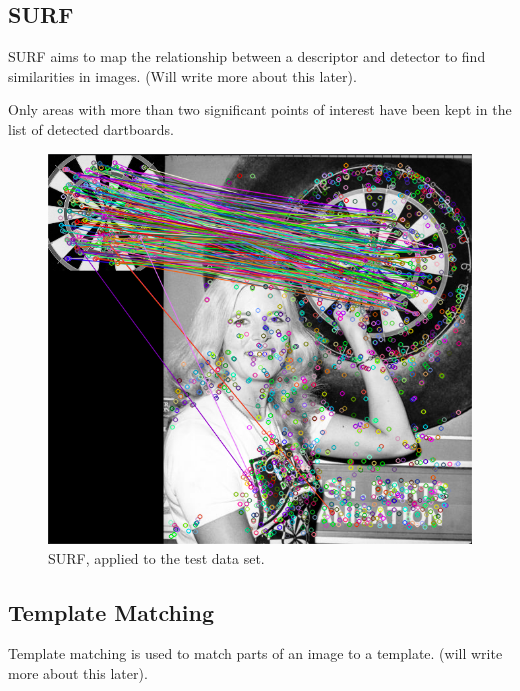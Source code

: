 \documentclass[conference]{IEEEtran}
\begin{document}
\subsection{SURF}
SURF aims to map the relationship between a descriptor and detector to find similarities in images. (Will write more about this later). \par

Only areas with more than two significant points of interest have been kept in the list of detected dartboards.
\par 
\begin{figure}[htbp]
\begin{center}
\includegraphics[width=0.8\linewidth]{images/SURF.png}
\caption{SURF, applied to the test data set. }
\label{default}
\end{center}
\end{figure}



\subsection{Template Matching}
Template matching is used to  match parts of an image to a template. (will write more about this later).
\end{document}
